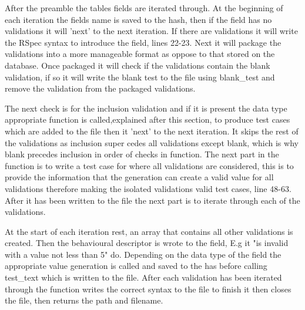 \documentclass[a4paper,12pt]{article}
\begin{document}
\vspace{3mm}
\par After the preamble the tables fields are iterated through. At the beginning of each iteration the fields name is saved to the hash, then if the field has no validations it will 'next' to the next iteration. If there are validations it will write the RSpec syntax to introduce the field, lines 22-23. Next it will package the validations into a more manageable format as oppose to that stored on the database. Once packaged it will check if the validations contain the blank validation, if so it will write the blank test to the file using blank\_test and remove the validation from the packaged validations. 
\vspace{3mm}
\par The next check is for the inclusion validation and if it is present the data type appropriate function is called,explained after this section, to produce test cases which are added to the file then it 'next' to the next iteration. It skips the rest of the validations as inclusion super cedes all validations except blank, which is why blank precedes inclusion in order of checks in function. The next part in the function is to write a test case for where all validations are considered, this is to provide the information that the generation can create a valid value for all validations therefore making the isolated validations valid test cases, line 48-63. After it has been written to the file the next part is to iterate through each of the validations. 
\vspace{3mm}
\par At the start of each iteration rest, an array that contains all other validations is created. Then the behavioural descriptor is wrote to the field, E.g it "is invalid with a value not less than 5" do. Depending on the data type of the field the appropriate value generation is called and saved to the has before calling test\_text which is written to the file. After each validation has been iterated through the function writes the correct syntax to the file to finish it then closes the file, then returns the path and filename.
\end{document}
